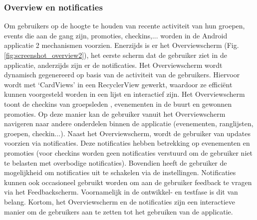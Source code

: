 \subsubsection{Overview en notificaties} %
Om gebruikers op de hoogte te houden van recente activiteit van hun groepen, events die aan de gang zijn, promoties, checkins,... worden in de Android applicatie 2 mechanismen voorzien. 
Enerzijds is er het Overviewscherm (Fig. \ref{fig:screenshot_overview2}), het eerste scherm dat de gebruiker ziet in de applicatie, anderzijds zijn er de notificaties.
Het Overviewscherm wordt dynamisch gegenereerd op basis van de activiteit van de gebruikers. Hiervoor wordt met `CardViews' in een RecyclerView gewerkt, waardoor ze efficiënt kunnen voorgesteld worden in een lijst en interactief zijn. Het Overviewscherm toont de checkins van groepsleden , evenementen in de buurt en gewonnen promoties. Op deze manier kan de gebruiker vanuit het Overviewscherm navigeren naar andere onderdelen binnen de applicatie (evenementen, ranglijsten, groepen, checkin...).
Naast het Overviewscherm, wordt de gebruiker van updates voorzien via notificaties. Deze notificaties hebben betrekking op evenementen en promoties (voor checkins worden geen notificaties verstuurd om de gebruiker niet te belasten met overbodige notificaties). Bovendien heeft de gebruiker de mogelijkheid om notificaties uit te schakelen via de instellingen. Notificaties kunnen ook occasioneel gebruikt worden om aan de gebruiker feedback te vragen via het Feedbackscherm. Voornamelijk in de ontwikkel- en testfase is dit van belang.
Kortom, het Overviewscherm en de notificaties zijn een interactieve manier om de gebruikers aan te zetten tot het gebruiken van de applicatie.

